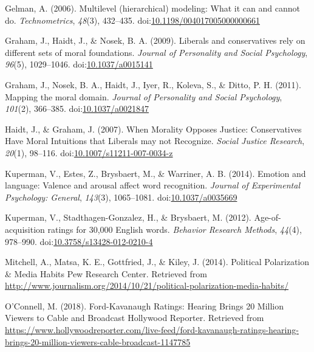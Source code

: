 \documentclass[,man]{apa6}
\begin{document}
\leavevmode\hypertarget{ref-Gelman2006}{}%
Gelman, A. (2006). Multilevel (hierarchical) modeling: What it can and cannot do. \emph{Technometrics}, \emph{48}(3), 432--435. doi:\href{https://doi.org/10.1198/004017005000000661}{10.1198/004017005000000661}

\leavevmode\hypertarget{ref-Graham2009}{}%
Graham, J., Haidt, J., \& Nosek, B. A. (2009). Liberals and conservatives rely on different sets of moral foundations. \emph{Journal of Personality and Social Psychology}, \emph{96}(5), 1029--1046. doi:\href{https://doi.org/10.1037/a0015141}{10.1037/a0015141}

\leavevmode\hypertarget{ref-Graham2011}{}%
Graham, J., Nosek, B. A., Haidt, J., Iyer, R., Koleva, S., \& Ditto, P. H. (2011). Mapping the moral domain. \emph{Journal of Personality and Social Psychology}, \emph{101}(2), 366--385. doi:\href{https://doi.org/10.1037/a0021847}{10.1037/a0021847}

\leavevmode\hypertarget{ref-Haidt2007}{}%
Haidt, J., \& Graham, J. (2007). When Morality Opposes Justice: Conservatives Have Moral Intuitions that Liberals may not Recognize. \emph{Social Justice Research}, \emph{20}(1), 98--116. doi:\href{https://doi.org/10.1007/s11211-007-0034-z}{10.1007/s11211-007-0034-z}

\leavevmode\hypertarget{ref-Kuperman2014}{}%
Kuperman, V., Estes, Z., Brysbaert, M., \& Warriner, A. B. (2014). Emotion and language: Valence and arousal affect word recognition. \emph{Journal of Experimental Psychology: General}, \emph{143}(3), 1065--1081. doi:\href{https://doi.org/10.1037/a0035669}{10.1037/a0035669}

\leavevmode\hypertarget{ref-Kuperman2012}{}%
Kuperman, V., Stadthagen-Gonzalez, H., \& Brysbaert, M. (2012). Age-of-acquisition ratings for 30,000 English words. \emph{Behavior Research Methods}, \emph{44}(4), 978--990. doi:\href{https://doi.org/10.3758/s13428-012-0210-4}{10.3758/s13428-012-0210-4}

\leavevmode\hypertarget{ref-Mitchell2014}{}%
Mitchell, A., Matsa, K. E., Gottfried, J., \& Kiley, J. (2014). Political Polarization \& Media Habits \textbar{} Pew Research Center. Retrieved from \url{http://www.journalism.org/2014/10/21/political-polarization-media-habits/}

\leavevmode\hypertarget{ref-OConnell2018}{}%
O'Connell, M. (2018). Ford-Kavanaugh Ratings: Hearing Brings 20 Million Viewers to Cable and Broadcast \textbar{} Hollywood Reporter. Retrieved from \url{https://www.hollywoodreporter.com/live-feed/ford-kavanaugh-ratings-hearing-brings-20-million-viewers-cable-broadcast-1147785}
\end{document}
